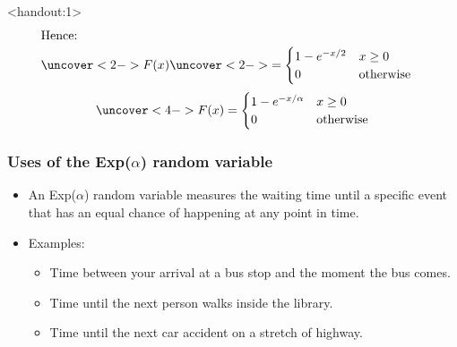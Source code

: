 \documentclass[handout]{beamer}\usepackage{graphicx, color}
\newcommand{\answers}{1}
\numberwithin{equation}{section}
\begin{document}
\begin{frame}<handout:\answers>
\begin{align*}
\intertext{Hence:}
\uncover<2->{F(x)} & \uncover<2->{= \begin{cases}
1 - e^{-x/2} & x \ge 0 \\
0 & \text{otherwise}
\end{cases}}
\end{align*}
\begin{align*}
\uncover<4->{F(x) = \begin{cases}
1 - e^{-x/\alpha} & x \ge 0 \\
0 & \text{otherwise}
\end{cases}}
\end{align*}
\end{frame}




\begin{frame}
\frametitle{Uses of the Exp($\alpha$) random variable}
\begin{itemize}
\pause \item An Exp($\alpha$) random variable measures the waiting time until a specific event that has an equal chance of happening at any point in time.
\pause \item Examples:
\begin{itemize}
\pause \item Time between your arrival at a bus stop and the moment the bus comes.
\pause \item Time until the next person walks inside the library.
\pause \item Time until the next car accident on a stretch of highway.
\end{itemize}
\end{itemize}
\end{frame}
\end{document}
